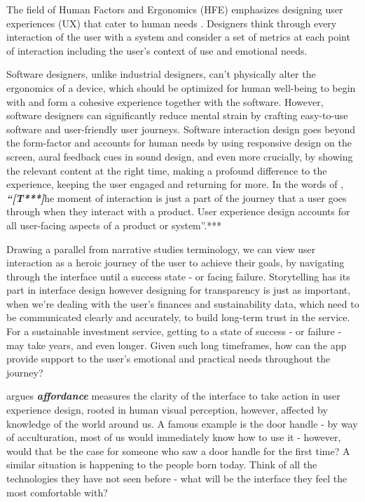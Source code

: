 \documentclass[
  letterpaper,
  DIV=11,
  numbers=noendperiod]{scrartcl}
\begin{document}
The field of Human Factors and Ergonomics (HFE) emphasizes designing
user experiences (UX) that cater to human needs
\citep{theinternationalergonomicsassociationHumanFactorsErgonomics2019}.
Designers think through every interaction of the user with a system and
consider a set of metrics at each point of interaction including the
user's context of use and emotional needs.

Software designers, unlike industrial designers, can't physically alter
the ergonomics of a device, which should be optimized for human
well-being to begin with and form a cohesive experience together with
the software. However, software designers can significantly reduce
mental strain by crafting easy-to-use software and user-friendly user
journeys. Software interaction design goes beyond the form-factor and
accounts for human needs by using responsive design on the screen, aural
feedback cues in sound design, and even more crucially, by showing the
relevant content at the right time, making a profound difference to the
experience, keeping the user engaged and returning for more. In the
words of \citep{babichInteractionDesignVs2019},
\textbf{\emph{``{[}T***{]}}}he moment of interaction is just a part of
the journey that a user goes through when they interact with a product.
User experience design accounts for all user-facing aspects of a product
or system''.***

Drawing a parallel from narrative studies terminology, we can view user
interaction as a heroic journey of the user to achieve their goals, by
navigating through the interface until a success state - or facing
failure. Storytelling has its part in interface design however designing
for transparency is just as important, when we're dealing with the
user's finances and sustainability data, which need to be communicated
clearly and accurately, to build long-term trust in the service. For a
sustainable investment service, getting to a state of success - or
failure - may take years, and even longer. Given such long timeframes,
how can the app provide support to the user's emotional and practical
needs throughout the journey?

\citep{tubikstudioUXDesignGlossary2018} argues
\textbf{\emph{affordance}} measures the clarity of the interface to take
action in user experience design, rooted in human visual perception,
however, affected by knowledge of the world around us. A famous example
is the door handle - by way of acculturation, most of us would
immediately know how to use it - however, would that be the case for
someone who saw a door handle for the first time? A similar situation is
happening to the people born today. Think of all the technologies they
have not seen before - what will be the interface they feel the most
comfortable with?
\end{document}
